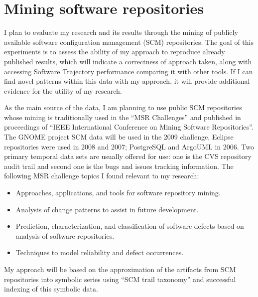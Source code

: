 \section{Mining software repositories}\label{public.evaluation}
I plan to evaluate my research and its results through the mining of publicly available software configuration management (SCM) repositories. The goal of this experiments is to assess the ability of my approach to reproduce already published results, which will indicate a correctness of approach taken, along with accessing Software Trajectory performance comparing it with other tools. If I can find novel patterns within this data with my approach, it will provide additional evidence for the utility of my research.

As the main source of the data, I am planning to use public SCM repositories whose mining is traditionally used in the ``MSR Challenges'' \cite{citeulike:5043676} and published in proceedings of ``IEEE International Conference on Mining Software Repositories''. The GNOME project SCM data will be used in the 2009 challenge, Eclipse repositories were used in 2008 and 2007; PostgreSQL and ArgoUML in 2006. Two primary temporal data sets are usually offered for use: one is the CVS repository audit trail and second one is the bugs and issues tracking information. The following MSR challenge topics I found relevant to my research:
\begin{itemize}
  \item Approaches, applications, and tools for software repository mining.
  \item Analysis of change patterns to assist in future development.
	\item Prediction, characterization, and classification of software defects based on analysis of software repositories.
	\item Techniques to model reliability and defect occurrences.
\end{itemize}
My approach will be based on the approximation of the artifacts from SCM repositories into symbolic series using ``SCM trail taxonomy'' and successful indexing of this symbolic data. 

